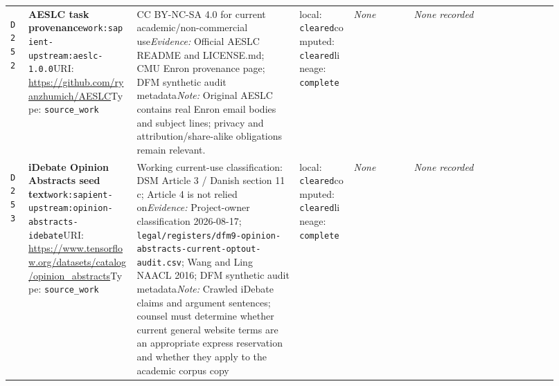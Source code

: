 \documentclass[9pt,a4paper]{article}
\newcommand{\depid}[1]{\hypertarget{dep:#1}{\texttt{#1}}}
\begin{document}
\begin{landscape}
\begin{longtable}{@{}L{0.035\linewidth}L{0.185\linewidth}L{0.27\linewidth}L{0.09\linewidth}L{0.10\linewidth}L{0.24\linewidth}@{}}
\depid{D252} & \textbf{AESLC task provenance}\newline \nolinkurl{work:sapient-upstream:aeslc-1.0.0}\newline URI: \url{https://github.com/ryanzhumich/AESLC}\newline Type: \texttt{source\_work} & CC BY-NC-SA 4.0 for current academic/non-commercial use\newline \textit{Evidence:} Official AESLC README and LICENSE.md; CMU Enron provenance page; DFM synthetic audit metadata\newline \textit{Note:} Original AESLC contains real Enron email bodies and subject lines; privacy and attribution/share-alike obligations remain relevant. & local: \texttt{cleared}\newline computed: \texttt{cleared}\newline lineage: \texttt{complete} & \textit{None} & \textit{None recorded} \\
\depid{D253} & \textbf{iDebate Opinion Abstracts seed text}\newline \nolinkurl{work:sapient-upstream:opinion-abstracts-idebate}\newline URI: \url{https://www.tensorflow.org/datasets/catalog/opinion_abstracts}\newline Type: \texttt{source\_work} & Working current-use classification: DSM Article 3 / Danish section 11 c; Article 4 is not relied on\newline \textit{Evidence:} Project-owner classification 2026-08-17; \nolinkurl{legal/registers/dfm9-opinion-abstracts-current-optout-audit.csv}; Wang and Ling NAACL 2016; DFM synthetic audit metadata\newline \textit{Note:} Crawled iDebate claims and argument sentences; counsel must determine whether current general website terms are an appropriate express reservation and whether they apply to the academic corpus copy & local: \texttt{cleared}\newline computed: \texttt{cleared}\newline lineage: \texttt{complete} & \textit{None} & \textit{None recorded} \\

\end{longtable}
\end{landscape}
\end{document}
